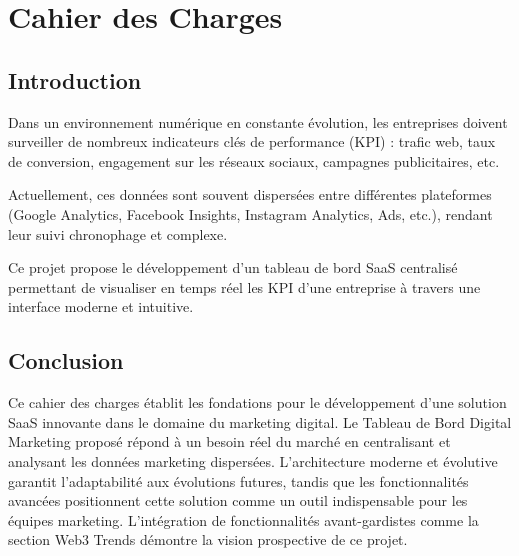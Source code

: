 \chapter{Cahier des Charges}

\section{Introduction}

Dans un environnement numérique en constante évolution, les entreprises doivent surveiller de nombreux indicateurs clés de performance (KPI) : trafic web, taux de conversion, engagement sur les réseaux sociaux, campagnes publicitaires, etc.

Actuellement, ces données sont souvent dispersées entre différentes plateformes (Google Analytics, Facebook Insights, Instagram Analytics,  Ads, etc.), rendant leur suivi chronophage et complexe.

Ce projet propose le développement d'un tableau de bord SaaS centralisé permettant de visualiser en temps réel les KPI d'une entreprise à travers une interface moderne et intuitive.


\section{Conclusion}

Ce cahier des charges établit les fondations pour le développement d'une solution SaaS innovante dans le domaine du marketing digital. Le Tableau de Bord Digital Marketing proposé répond à un besoin réel du marché en centralisant et analysant les données marketing dispersées. L'architecture moderne et évolutive garantit l'adaptabilité aux évolutions futures, tandis que les fonctionnalités avancées positionnent cette solution comme un outil indispensable pour les équipes marketing. L'intégration de fonctionnalités avant-gardistes comme la section Web3 Trends démontre la vision prospective de ce projet. 